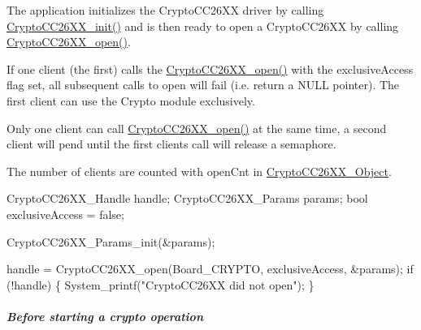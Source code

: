 \begin{DoxyItemize}
\item The application initializes the Crypto\+C\+C26\+X\+X driver by calling \hyperlink{_crypto_c_c26_x_x_8h_a512b301a6ebf10a41c86d9ff725f7749}{Crypto\+C\+C26\+X\+X\+\_\+init()} and is then ready to open a Crypto\+C\+C26\+X\+X by calling \hyperlink{_crypto_c_c26_x_x_8h_a21aa1458d0b063ee3637a40487e8ee12}{Crypto\+C\+C26\+X\+X\+\_\+open()}.
\item If one client (the first) calls the \hyperlink{_crypto_c_c26_x_x_8h_a21aa1458d0b063ee3637a40487e8ee12}{Crypto\+C\+C26\+X\+X\+\_\+open()} with the exclusive\+Access flag set, all subsequent calls to open will fail (i.\+e. return a N\+U\+L\+L pointer). The first client can use the Crypto module exclusively.
\item Only one client can call \hyperlink{_crypto_c_c26_x_x_8h_a21aa1458d0b063ee3637a40487e8ee12}{Crypto\+C\+C26\+X\+X\+\_\+open()} at the same time, a second client will pend until the first client\textquotesingle{}s call will release a semaphore.
\item The number of clients are counted with open\+Cnt in \hyperlink{struct_crypto_c_c26_x_x___object}{Crypto\+C\+C26\+X\+X\+\_\+\+Object}.
\end{DoxyItemize}
\begin{DoxyCode}
CryptoCC26XX_Handle      handle;
CryptoCC26XX_Params      params;
\textcolor{keywordtype}{bool}                     exclusiveAccess = \textcolor{keyword}{false};

CryptoCC26XX_Params_init(&params);

handle = CryptoCC26XX_open(Board\_CRYPTO, exclusiveAccess, &params);
\textcolor{keywordflow}{if} (!handle) \{
    System\_printf(\textcolor{stringliteral}{"CryptoCC26XX did not open"});
\}
\end{DoxyCode}


\subparagraph*{Before starting a crypto operation}


